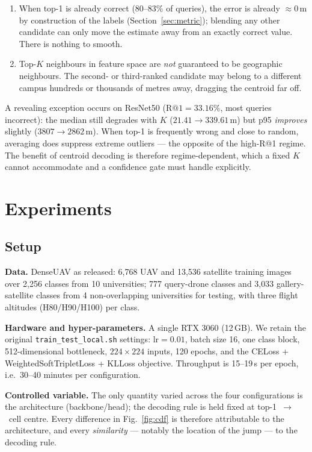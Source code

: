 \documentclass[journal]{IEEEtran}
\begin{document}
\begin{enumerate}
\item When top-1 is already correct (80--83\% of queries), the error is already
$\approx 0$\,m by construction of the labels (Section~\ref{sec:metric}); blending any
other candidate can only move the estimate away from an exactly correct value. There is
nothing to smooth.
\item Top-$K$ neighbours in feature space are \emph{not} guaranteed to be geographic
neighbours. The second- or third-ranked candidate may belong to a different campus
hundreds or thousands of metres away, dragging the centroid far off.
\end{enumerate}

A revealing exception occurs on ResNet50 ($\text{R@1}=33.16\%$, most queries incorrect):
the median still degrades with $K$ ($21.41 \rightarrow 339.61$\,m) but p95 \emph{improves}
slightly ($3807 \rightarrow 2862$\,m). When top-1 is frequently wrong and close to random,
averaging does suppress extreme outliers --- the opposite of the high-R@1 regime. The
benefit of centroid decoding is therefore regime-dependent, which a fixed $K$ cannot
accommodate and a confidence gate must handle explicitly.

\section{Experiments}

\subsection{Setup}
\textbf{Data.} DenseUAV as released: 6{,}768 UAV and 13{,}536 satellite training images
over 2{,}256 classes from 10 universities; 777 query-drone classes and 3{,}033
gallery-satellite classes from 4 non-overlapping universities for testing, with three
flight altitudes (H80/H90/H100) per class.

\textbf{Hardware and hyper-parameters.} A single RTX 3060 (12\,GB). We retain the original
\texttt{train\_test\_local.sh} settings: $\mathrm{lr}=0.01$, batch size 16, one class
block, 512-dimensional bottleneck, $224 \times 224$ inputs, 120 epochs, and the
CELoss + WeightedSoftTripletLoss + KLLoss objective. Throughput is 15--19\,s per epoch,
i.e.\ 30--40 minutes per configuration.

\textbf{Controlled variable.} The only quantity varied across the four configurations is
the architecture (backbone/head); the decoding rule is held fixed at
top-1~$\rightarrow$~cell centre. Every difference in Fig.~\ref{fig:cdf} is therefore
attributable to the architecture, and every \emph{similarity} --- notably the location of
the jump --- to the decoding rule.
\end{document}
